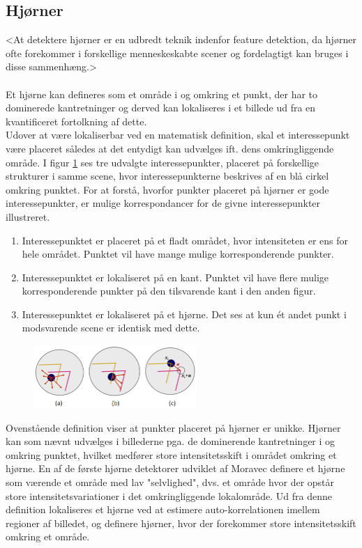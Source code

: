 \subsection{Hjørner}\label{subsec:corner}
<At detektere hjørner er en udbredt teknik indenfor feature detektion, da hjørner ofte forekommer i forskellige menneskeskabte scener og fordelagtigt kan bruges i disse sammenhæng.> 
\\
\\
Et hjørne kan defineres som et område i og omkring et punkt, der har to dominerede kantretninger og derved kan lokaliseres i et billede ud fra en kvantificeret fortolkning af dette. \\ 
Udover at være lokaliserbar ved en matematisk definition, skal et interessepunkt være placeret således at det entydigt kan udvælges ift. dens omkringliggende område. I figur \ref{app} ses tre udvalgte interessepunkter, placeret på forskellige strukturer i samme scene, hvor interessepunkterne beskrives af en blå cirkel omkring punktet. For at forstå, hvorfor punkter placeret på hjørner er gode interessepunkter, er mulige korrespondancer for de givne interessepunkter illustreret.
\begin{enumerate}[label=\alph*]
\item{Interessepunktet er placeret på et fladt området, hvor intensiteten er ens for hele området. Punktet vil have mange mulige korresponderende punkter.}
\item{Interessepunktet er lokaliseret på en kant. Punktet vil have flere mulige korresponderende punkter på den tilsvarende kant i den anden figur.}
\item{Interessepunktet er lokaliseret på et hjørne. Det ses at kun ét andet punkt i modsvarende scene er identisk med dette.}
\end{enumerate}
\begin{figure}[H]
    \centering
    \includegraphics[width=0.55\textwidth]{fig/37.png}
    \vspace{-1em}   
    \begin{center}    
    \caption{\textcolor{gray}{\footnotesize \textit{
 }}}
    \label{app}
     \end{center}
    \vspace{-2.7em}  
  \end{figure}  
\noindent
Ovenstående definition viser at punkter placeret på hjørner er unikke. Hjørner kan som nævnt udvælges i billederne pga. de dominerende kantretninger i og omkring punktet, hvilket medfører store intensitetsskift i området omkring et hjørne. En af de første hjørne detektorer udviklet af Moravec \cite{Moravec} definere et hjørne som værende et område med lav "selvlighed", dvs. et område hvor der opstår store intensitetsvariationer i det omkringliggende lokalområde. Ud fra denne definition lokaliseres et hjørne ved at estimere auto-korrelationen imellem regioner af billedet, og definere hjørner, hvor der forekommer store intensitetsskift omkring et område.